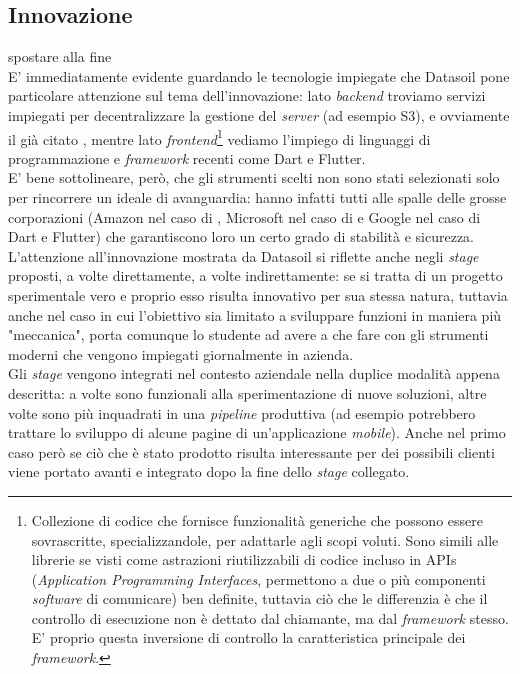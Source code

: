 \subsection{Innovazione}
\todo{} spostare alla fine\\
E' immediatamente evidente guardando le tecnologie impiegate che Datasoil pone particolare attenzione sul tema dell'innovazione: lato \textit{backend} troviamo servizi \aws{} impiegati per decentralizzare la gestione del \textit{server} (ad esempio S3), e ovviamente il già citato \asa{}, mentre lato \textit{frontend}\footnote{Collezione di codice che fornisce funzionalità generiche che possono essere sovrascritte, specializzandole, per adattarle agli scopi voluti. Sono simili alle librerie se visti come astrazioni riutilizzabili di codice incluso in APIs (\textit{Application Programming Interfaces}, permettono a due o più componenti \textit{software} di comunicare) ben definite, tuttavia ciò che le differenzia è che il controllo di esecuzione non è dettato dal chiamante, ma dal \textit{framework} stesso. E' proprio questa inversione di controllo la caratteristica principale dei \textit{framework}.} vediamo l'impiego di linguaggi di programmazione e \textit{framework} recenti come Dart e Flutter.\\
E' bene sottolineare, però, che gli strumenti scelti non sono stati selezionati solo per rincorrere un ideale di avanguardia: hanno infatti tutti alle spalle delle grosse corporazioni (Amazon nel caso di \aws{}, Microsoft nel caso di \asa{} e Google nel caso di Dart e Flutter) che garantiscono loro un certo grado di stabilità e sicurezza.\\
L'attenzione all'innovazione mostrata da Datasoil si riflette anche negli \textit{stage} proposti, a volte direttamente, a volte indirettamente: se si tratta di un progetto sperimentale vero e proprio esso risulta innovativo per sua stessa natura, tuttavia anche nel caso in cui l'obiettivo sia limitato a sviluppare funzioni in maniera più "meccanica", porta comunque lo studente ad avere a che fare con gli strumenti moderni che vengono impiegati giornalmente in azienda.\\
Gli \textit{stage} vengono integrati nel contesto aziendale nella duplice modalità appena descritta: a volte sono funzionali alla sperimentazione di nuove soluzioni, altre volte sono più inquadrati in una \textit{pipeline} produttiva (ad esempio potrebbero trattare lo sviluppo di alcune pagine di un'applicazione \textit{mobile}). Anche nel primo caso però se ciò che è stato prodotto risulta interessante per dei possibili clienti viene portato avanti e integrato dopo la fine dello \textit{stage} collegato.

